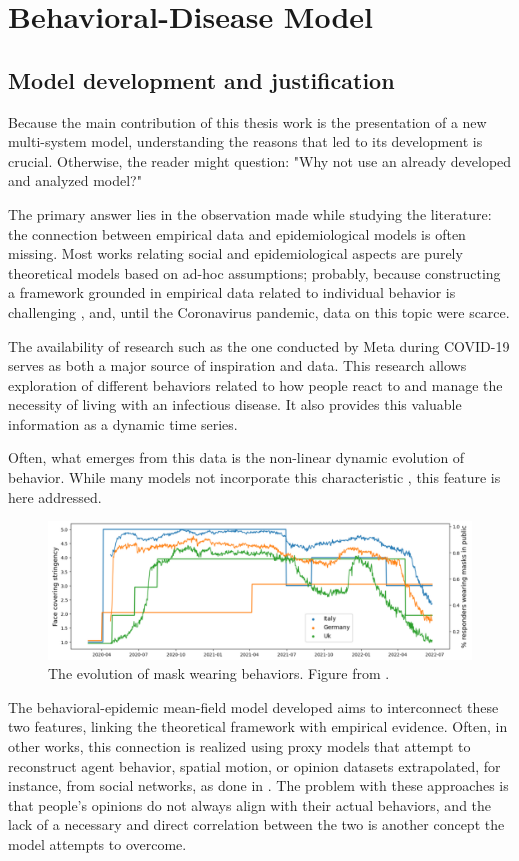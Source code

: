 \part{Behavioral-Disease Model}
\label{part:the_model}
\chapter{Model development and justification}
\label{ch:why_new}
Because the main contribution of this thesis work is the presentation of a new multi-system model, understanding the reasons that led to its development is crucial.
Otherwise, the reader might question: "Why not use an already developed and analyzed model?"

The primary answer lies in the observation made while studying the literature: the connection between empirical data and epidemiological models is often missing. Most works relating social and epidemiological aspects are purely theoretical models based on ad-hoc assumptions; probably, because constructing a framework grounded in empirical data related to individual behavior is challenging \cite{Nunner2021}, and, until the Coronavirus pandemic, data on this topic were scarce.

The availability of research such as the one conducted by Meta during COVID-19 \cite{Astley_2021} serves as both a major source of inspiration and data. This research allows exploration of different behaviors related to how people react to and manage the necessity of living with an infectious disease. It also provides this valuable information as a dynamic time series.

Often, what emerges from this data is the non-linear dynamic evolution of behavior. While many models not incorporate this characteristic \cite{huys2010nonlinear}, this feature is here addressed.
\begin{figure}[ht]
	\centering
	\includegraphics[width=0.8\linewidth]{1_corpo/figure/Fig2cut}
	\caption[Mask wearing evolution]{The evolution of mask wearing behaviors. Figure from \cite{Proverbio_Tex_2024}.}
	\label{fig:mask_wearing}
\end{figure}
The behavioral-epidemic mean-field model developed aims to interconnect these two features, linking the theoretical framework with empirical evidence. Often, in other works, this connection is realized using proxy models that attempt to reconstruct agent behavior, spatial motion, or opinion datasets extrapolated, for instance, from social networks, as done in \cite{Anderson_2019,Zino_2021}. The problem with these approaches is that people's opinions do not always align with their actual behaviors, and the lack of a necessary and direct correlation between the two is another concept the model attempts to overcome.

